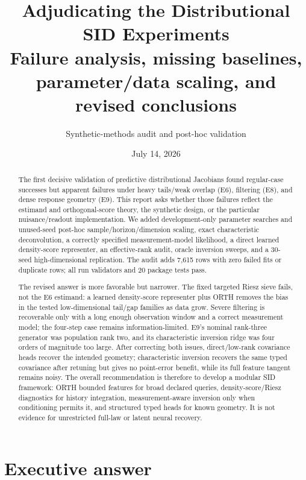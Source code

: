 \documentclass[10.5pt]{article}
\title{\textbf{Adjudicating the Distributional SID Experiments}\\
\large Failure analysis, missing baselines, parameter/data scaling, and revised conclusions}
\author{Synthetic-methods audit and post-hoc validation}
\date{July 14, 2026}
\begin{document}
\maketitle

\begin{abstract}
The first decisive validation of predictive distributional Jacobians found regular-case successes but apparent failures under heavy tails/weak overlap (E6), filtering (E8), and dense response geometry (E9).  This report asks whether those failures reflect the estimand and orthogonal-score theory, the synthetic design, or the particular nuisance/readout implementation.  We added development-only parameter searches and unused-seed post-hoc sample/horizon/dimension scaling, exact characteristic deconvolution, a correctly specified measurement-model likelihood, a direct learned density-score representer, an effective-rank audit, oracle inversion sweeps, and a 30-seed high-dimensional replication.  The audit adds 7,615 rows with zero failed fits or duplicate rows; all run validators and 20 package tests pass.

The revised answer is more favorable but narrower.  The fixed targeted Riesz sieve fails, not the E6 estimand: a learned density-score representer plus ORTH removes the bias in the tested low-dimensional tail/gap families as data grow.  Severe filtering is recoverable only with a long enough observation window and a correct measurement model; the four-step case remains information-limited.  E9's nominal rank-three generator was population rank two, and its characteristic inversion ridge was four orders of magnitude too large.  After correcting both issues, direct/low-rank covariance heads recover the intended geometry; characteristic inversion recovers the same typed covariance after retuning but gives no point-error benefit, while its full feature tangent remains noisy.  The overall recommendation is therefore to develop a modular SID framework: ORTH bounded features for broad declared queries, density-score/Riesz diagnostics for history integration, measurement-aware inversion only when conditioning permits it, and structured typed heads for known geometry.  It is not evidence for unrestricted full-law or latent neural recovery.
\end{abstract}

\section{Executive answer}
\end{document}
